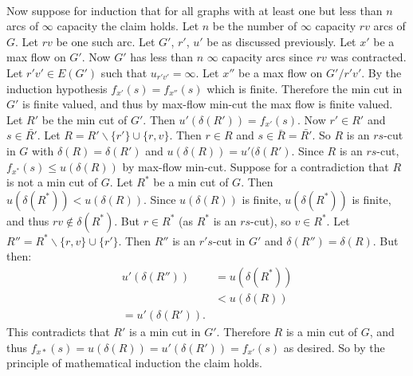 \documentclass[letterpaper,12pt,oneside,onecolumn]{article}
\begin{document}
\paragraph{}
Now suppose for induction that for all graphs with at least one but less than $n$ arcs of $\infty$ capacity the claim holds. Let $n$ be the number of $\infty$ capacity $rv$ arcs of $G$. Let $rv$ be one such arc. Let $G'$, $r'$, $u'$ be as discussed previously. Let $x'$ be a max flow on $G'$. Now $G'$ has less than $n$ $\infty$ capacity arcs since $rv$ was contracted. Let $r'v' \in E(G')$ such that $u_{r'v'} = \infty$. Let $x''$ be a max flow on $G'/r'v'$. By the induction hypothesis $f_{x'}(s) = f_{x''}(s)$ which is finite. Therefore the min cut in $G'$ is finite valued, and thus by max-flow min-cut the max flow is finite valued. Let $R'$ be the min cut of $G'$. Then $u'(\delta(R')) = f_{x'}(s)$. Now $r' \in R'$ and $s \in \bar{R'}$. Let $R = R' \backslash\{r'\} \cup \{r,v\}$. Then $r \in R$ and $s \in \bar{R} = \bar{R'}$. So $R$ is an $rs$-cut in $G$ with $\delta(R) = \delta(R')$ and $u(\delta(R)) = u'(\delta(R')$. Since $R$ is an $rs$-cut, $f_{x^*}(s) \leq u(\delta(R))$ by max-flow min-cut. Suppose for a contradiction that $R$ is not a min cut of $G$. Let $R^*$ be a min cut of $G$. Then $u(\delta(R^*)) < u(\delta(R))$. Since $u(\delta(R))$ is finite, $u(\delta(R^*))$ is finite, and thus $rv \not\in \delta(R^*)$. But $r \in R^*$ (as $R^*$ is an $rs$-cut), so $v \in R^*$. Let $R'' = R^* \backslash \{r,v\} \cup \{r'\}$. Then $R''$ is an $r's$-cut in $G'$ and $\delta(R'') = \delta(R)$. But then:
\begin{align*}
u'(\delta(R'')) &= u(\delta(R^*)) \\
&< u(\delta(R)) \\
= u'(\delta(R')).
\end{align*}
This contradicts that $R'$ is a min cut in $G'$. Therefore $R$ is a min cut of $G$, and thus $f_{x*}(s) = u(\delta(R)) = u'(\delta(R')) = f_{x'}(s)$ as desired. So by the principle of mathematical induction the claim holds.
\end{document}
